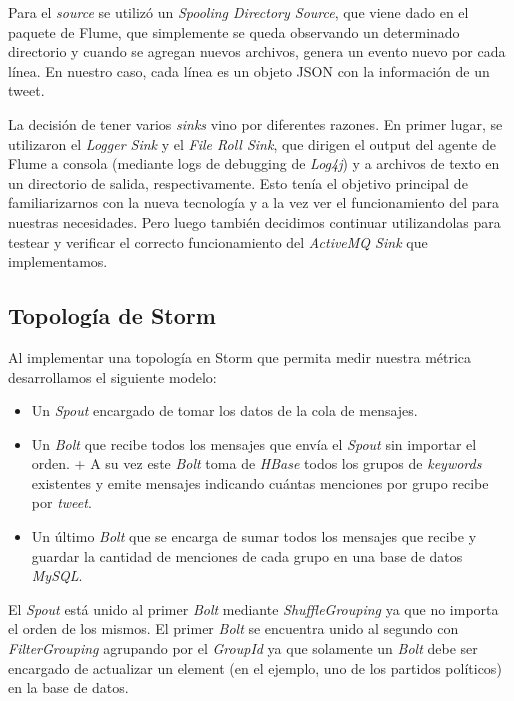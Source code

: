 \documentclass[a4paper,10pt]{article}
\begin{document}
Para el \textit{source} se utilizó un \textit{Spooling Directory Source}, que viene dado en el paquete de Flume, que simplemente se queda observando un
determinado directorio y cuando se agregan nuevos archivos, genera un evento nuevo por cada línea. En nuestro caso, cada línea es un objeto JSON con la información de un tweet.

La decisión de tener varios \textit{sinks} vino por diferentes razones. En primer lugar, se utilizaron el \textit{Logger Sink} y el \textit{File Roll Sink}, que dirigen el output
del agente de Flume a consola (mediante logs de debugging de \textit{Log4j}) y a archivos de texto en un directorio de salida, respectivamente. Esto tenía el objetivo principal de
familiarizarnos con la nueva tecnología y a la vez ver el funcionamiento del  para nuestras necesidades. Pero luego también decidimos continuar
utilizandolas para testear y verificar el correcto funcionamiento del \textit{ActiveMQ Sink} que implementamos.

\subsection{Topología de Storm}

Al implementar una topología en Storm que permita medir nuestra métrica desarrollamos el siguiente modelo:
\begin{itemize}
  \item Un \textit{Spout} encargado de tomar los datos de la cola de mensajes.
  \item Un \textit{Bolt} que recibe todos los mensajes que envía el \textit{Spout} sin importar el orden. +
		A su vez este \textit{Bolt} toma de \textit{HBase} todos los grupos de \textit{keywords} existentes y emite mensajes 
		indicando cuántas menciones por grupo recibe por \textit{tweet}.
  \item Un último \textit{Bolt} que se encarga de sumar todos los mensajes que recibe y guardar la cantidad de menciones de cada grupo en una base de datos \textit{MySQL}.
\end{itemize}
 
El \textit{Spout} está unido al primer \textit{Bolt} mediante \textit{ShuffleGrouping} ya que no importa el orden de los mismos.
El primer \textit{Bolt} se encuentra unido al segundo con \textit{FilterGrouping} agrupando por el \textit{GroupId} ya que solamente un 
\textit{Bolt} debe ser encargado de actualizar un element (en el ejemplo, uno de los partidos políticos) en la base de datos.
\end{document}
